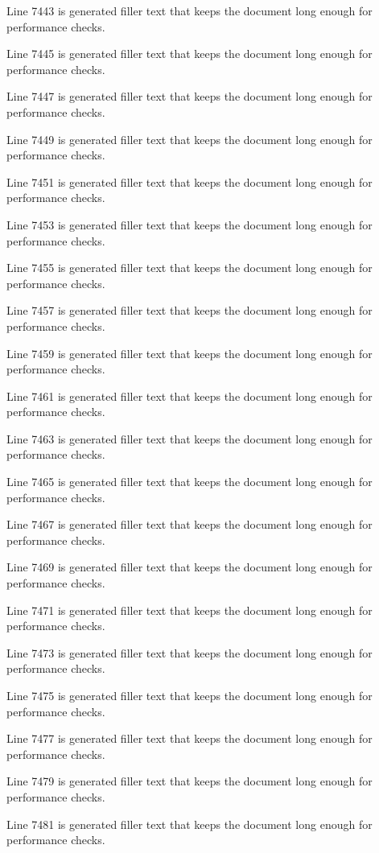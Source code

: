 Line 7443 is generated filler text that keeps the document long enough for performance checks.

Line 7445 is generated filler text that keeps the document long enough for performance checks.

Line 7447 is generated filler text that keeps the document long enough for performance checks.

Line 7449 is generated filler text that keeps the document long enough for performance checks.

Line 7451 is generated filler text that keeps the document long enough for performance checks.

Line 7453 is generated filler text that keeps the document long enough for performance checks.

Line 7455 is generated filler text that keeps the document long enough for performance checks.

Line 7457 is generated filler text that keeps the document long enough for performance checks.

Line 7459 is generated filler text that keeps the document long enough for performance checks.

Line 7461 is generated filler text that keeps the document long enough for performance checks.

Line 7463 is generated filler text that keeps the document long enough for performance checks.

Line 7465 is generated filler text that keeps the document long enough for performance checks.

Line 7467 is generated filler text that keeps the document long enough for performance checks.

Line 7469 is generated filler text that keeps the document long enough for performance checks.

Line 7471 is generated filler text that keeps the document long enough for performance checks.

Line 7473 is generated filler text that keeps the document long enough for performance checks.

Line 7475 is generated filler text that keeps the document long enough for performance checks.

Line 7477 is generated filler text that keeps the document long enough for performance checks.

Line 7479 is generated filler text that keeps the document long enough for performance checks.

Line 7481 is generated filler text that keeps the document long enough for performance checks.

